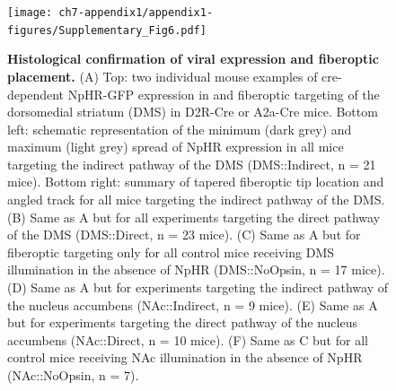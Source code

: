 \begin{figure}[t!]
\vspace{-1cm}
  \begin{center}
    \texttt{[image: ch7-appendix1/appendix1-figures/Supplementary\_Fig6.pdf]}
    \caption[Histological confirmation of viral expression and fiberoptic placement]{\textbf{Histological confirmation of viral expression and fiberoptic placement.} (A) Top: two individual mouse examples of cre-dependent NpHR-GFP expression in and fiberoptic targeting of the dorsomedial striatum (DMS) in D2R-Cre or A2a-Cre mice. Bottom left: schematic representation of the minimum (dark grey) and maximum (light grey) spread of NpHR expression in all mice targeting the indirect pathway of the DMS (DMS::Indirect, n = 21 mice). Bottom right: summary of tapered fiberoptic tip location and angled track for all mice targeting the indirect pathway of the DMS. (B) Same as A but for all experiments targeting the direct pathway of the DMS (DMS::Direct, n = 23 mice). (C) Same as A but for fiberoptic targeting only for all control mice receiving DMS illumination in the absence of NpHR (DMS::NoOpsin, n = 17 mice). (D) Same as A but for experiments targeting the indirect pathway of the nucleus accumbens (NAc::Indirect, n = 9 mice). (E) Same as A but for experiments targeting the direct pathway of the nucleus accumbens (NAc::Direct, n = 10 mice). (F) Same as C but for all control mice receiving NAc illumination in the absence of NpHR (NAc::NoOpsin, n = 7). }
    \label{fig:ap1:supp6}
  \end{center}
\end{figure}
